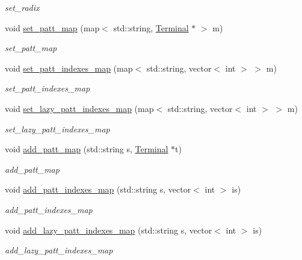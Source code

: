 \begin{DoxyCompactItemize}
\begin{DoxyCompactList}\small\item\em set\+\_\+radix \end{DoxyCompactList}\item 
void \hyperlink{class_problem_node_a32c401ce10dfaa57ac655f7babea4dbe}{set\+\_\+patt\+\_\+map} (map$<$ std\+::string, \hyperlink{class_terminal}{Terminal} $\ast$ $>$ m)
\begin{DoxyCompactList}\small\item\em set\+\_\+patt\+\_\+map \end{DoxyCompactList}\item 
void \hyperlink{class_problem_node_a01190aafe2a2a98e54248e24f616211e}{set\+\_\+patt\+\_\+indexes\+\_\+map} (map$<$ std\+::string, vector$<$ int $>$ $>$ m)
\begin{DoxyCompactList}\small\item\em set\+\_\+patt\+\_\+indexes\+\_\+map \end{DoxyCompactList}\item 
void \hyperlink{class_problem_node_af66d3a4c07b775317936081c8f65d5f4}{set\+\_\+lazy\+\_\+patt\+\_\+indexes\+\_\+map} (map$<$ std\+::string, vector$<$ int $>$ $>$ m)
\begin{DoxyCompactList}\small\item\em set\+\_\+lazy\+\_\+patt\+\_\+indexes\+\_\+map \end{DoxyCompactList}\item 
void \hyperlink{class_problem_node_aa13c3f089e810d16fe469e66da57d77f}{add\+\_\+patt\+\_\+map} (std\+::string s, \hyperlink{class_terminal}{Terminal} $\ast$t)
\begin{DoxyCompactList}\small\item\em add\+\_\+patt\+\_\+map \end{DoxyCompactList}\item 
void \hyperlink{class_problem_node_aa5051b2706175f404395ed70733baa03}{add\+\_\+patt\+\_\+indexes\+\_\+map} (std\+::string s, vector$<$ int $>$ is)
\begin{DoxyCompactList}\small\item\em add\+\_\+patt\+\_\+indexes\+\_\+map \end{DoxyCompactList}\item 
void \hyperlink{class_problem_node_a11b21decb60550d8b1fafae8ae2392c9}{add\+\_\+lazy\+\_\+patt\+\_\+indexes\+\_\+map} (std\+::string s, vector$<$ int $>$ is)
\begin{DoxyCompactList}\small\item\em add\+\_\+lazy\+\_\+patt\+\_\+indexes\+\_\+map \end{DoxyCompactList}\item 

\end{DoxyCompactItemize}
